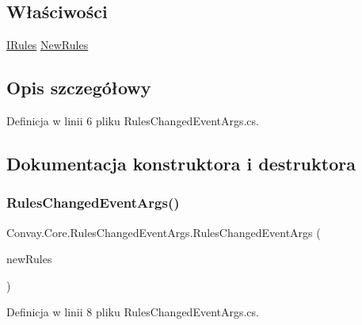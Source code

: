 \subsection*{Właściwości}
\begin{DoxyCompactItemize}
\item 
\hyperlink{interface_convay_1_1_core_1_1_interfaces_1_1_i_rules}{I\+Rules} \hyperlink{class_convay_1_1_core_1_1_rules_changed_event_args_a6f1fa511ac4ab4723cca164dc1aee683}{New\+Rules}
\end{DoxyCompactItemize}


\subsection{Opis szczegółowy}


Definicja w linii 6 pliku Rules\+Changed\+Event\+Args.\+cs.



\subsection{Dokumentacja konstruktora i destruktora}
\hypertarget{class_convay_1_1_core_1_1_rules_changed_event_args_a196dba0faa4e265ee93ad9ac498e4ad3}{}\label{class_convay_1_1_core_1_1_rules_changed_event_args_a196dba0faa4e265ee93ad9ac498e4ad3} 
\subsubsection{\texorpdfstring{Rules\+Changed\+Event\+Args()}{RulesChangedEventArgs()}}
{\footnotesize\ttfamily Convay.\+Core.\+Rules\+Changed\+Event\+Args.\+Rules\+Changed\+Event\+Args (\begin{DoxyParamCaption}\item[{\hyperlink{interface_convay_1_1_core_1_1_interfaces_1_1_i_rules}{I\+Rules}}]{new\+Rules }\end{DoxyParamCaption})}



Definicja w linii 8 pliku Rules\+Changed\+Event\+Args.\+cs.



